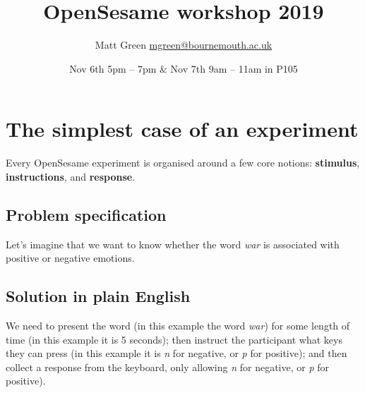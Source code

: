 \documentclass[a4paper]{tufte-handout}
\title{OpenSesame workshop 2019}%
\date{Nov 6th 5pm -- 7pm \& Nov 7th 9am -- 11am in P105}
\author{Matt Green \href{mailto:mgreen@bournemouth.ac.uk}{mgreen@bournemouth.ac.uk} }
\begin{document}
%
\maketitle
\tableofcontents




\section{The simplest case of an experiment}
Every OpenSesame experiment is organised around a few core notions: \textbf{stimulus}, \textbf{instructions}, and \textbf{response}.


\subsection{Problem specification}
Let's imagine that we want to know whether the word \emph{war} is associated with positive or negative emotions.

\subsection{Solution in plain English}
We need to present the word (in this example the word \emph{war}) for some length of time (in this example it is 5 seconds); then instruct the participant what keys they can press (in this example it is \emph{n} for negative, or \emph{p} for positive); and then collect a response from the keyboard, only allowing \emph{n} for negative, or \emph{p} for positive).
\end{document}
